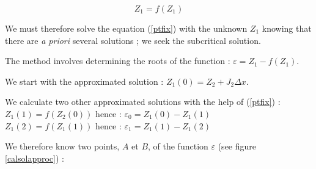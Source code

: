 \begin{equation}
  \label{ptfix}
  Z_1 = f(Z_1)
\end{equation}

\vspace{0.5cm}

We must therefore solve the equation (\ref{ptfix}) with the unknown $Z_1$ knowing that there are \textit{a priori} several solutions ; we seek the subcritical solution.

\vspace{0.5cm}

The method involves determining the roots of the function : $\varepsilon = Z_1 - f(Z_1)$.

\vspace{0.5cm}

We start with the approximated solution : $Z_1(0) = Z_2 + J_2 \Delta x$.

\vspace{0.5cm}

We calculate two other approximated solutions with the help of (\ref{ptfix}) : \\
$Z_1(1) = f(Z_2(0))$ hence : $\varepsilon_0 = Z_1(0) - Z_1(1)$ \\
$Z_1(2) = f(Z_1(1))$ hence : $\varepsilon_1 = Z_1(1) - Z_1(2)$

\vspace{0.5cm}

We therefore know two points, $A$ et $B$, of the function $\varepsilon$ (see figure \ref{calsolapproc}) :

